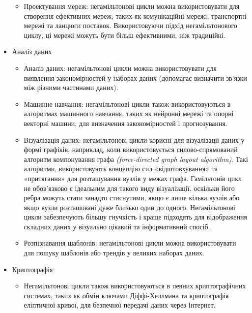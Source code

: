 \documentclass[14pt]{article}
\begin{document}
\begin{spacing}{1.175}
\begin{itemize}
\begin{itemize}
            \item Проектування мереж: негамільтонові цикли можна використовувати для створення ефективних мереж, таких як комунікаційні мережі, транспортні мережі та ланцюги поставок. Використовуючи підхід негамільтонового циклу, ці мережі можуть бути більш ефективними, ніж традиційні.
            
        \end{itemize}


        \item Аналіз даних
        \begin{itemize}
            
            \item Аналіз даних: негамільтонові цикли можна використовувати для виявлення закономірностей у наборах даних (допомагає визначити зв’язки між різними частинами даних).
            
            \item Машинне навчання: негамільтонові цикли також використовуються в алгоритмах машинного навчання, таких як нейронні мережі та опорні векторні машини, для визначення закономірностей і прогнозування.
                
            \item Візуалізація даних: негамільтонові цикли корисні для візуалізації даних у формі графіків, наприклад, коли використовується силово-спрямований алгоритм компонування графа \textit{(force-directed graph layout algorithm)}. Такі алгоритми, використовують концепцію сил «відштовхування» та «притягання» для розташування вузлів у межах графа. Гамільтонів цикл не обов’язково є ідеальним для такого виду візуалізації, оскільки його ребра можуть стати занадто стиснутими, якщо є лише кілька вузлів або якщо вузли розташовані дуже близько один до одного. Негамільтонові цикли забезпечують більшу гнучкість і краще підходять для відображення складних даних у візуально цікавий та інформативний спосіб.

            \item Розпізнавання шаблонів: негамільтонові цикли можна використовувати для пошуку шаблонів або трендів у великих наборах даних.
        
        \end{itemize}


        \item Криптографія
        \begin{itemize}
             
             \item Негамільтонові цикли також використовуються в певних криптографічних системах, таких як обмін ключами Діффі-Хеллмана та криптографія еліптичної кривої, для безпечної передачі даних через Інтернет.
        

\end{itemize}
\end{itemize}
\end{spacing}
\end{document}
